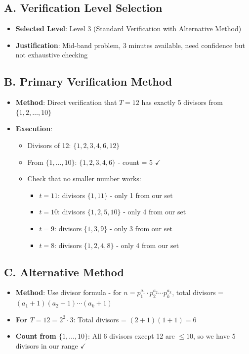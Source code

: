 \documentclass[]{article}
\begin{document}
\begin{verificationbox}
\subsection*{A. Verification Level Selection}
\begin{itemize}[leftmargin=*]
    \item \textbf{Selected Level}: Level 3 (Standard Verification with Alternative Method)
    \item \textbf{Justification}: Mid-band problem, 3 minutes available, need confidence but not exhaustive checking
\end{itemize}

\subsection*{B. Primary Verification Method}
\begin{itemize}[leftmargin=*]
    \item \textbf{Method}: Direct verification that $T = 12$ has exactly 5 divisors from $\{1,2,\ldots,10\}$
    \item \textbf{Execution}:
    \begin{itemize}
        \item Divisors of 12: $\{1, 2, 3, 4, 6, 12\}$
        \item From $\{1,\ldots,10\}$: $\{1, 2, 3, 4, 6\}$ - count = 5 $\checkmark$
        \item Check that no smaller number works:
        \begin{itemize}
            \item $t = 11$: divisors $\{1, 11\}$ - only 1 from our set
            \item $t = 10$: divisors $\{1, 2, 5, 10\}$ - only 4 from our set
            \item $t = 9$: divisors $\{1, 3, 9\}$ - only 3 from our set
            \item $t = 8$: divisors $\{1, 2, 4, 8\}$ - only 4 from our set
        \end{itemize}
    \end{itemize}
\end{itemize}

\subsection*{C. Alternative Method}
\begin{itemize}[leftmargin=*]
    \item \textbf{Method}: Use divisor formula - for $n = p_1^{a_1} \cdot p_2^{a_2} \cdots p_k^{a_k}$, total divisors = $(a_1+1)(a_2+1)\cdots(a_k+1)$
    \item \textbf{For $T = 12 = 2^2 \cdot 3$}: Total divisors = $(2+1)(1+1) = 6$
    \item \textbf{Count from $\{1,\ldots,10\}$}: All 6 divisors except 12 are $\leq 10$, so we have 5 divisors in our range $\checkmark$
\end{itemize}


\end{verificationbox}
\end{document}
